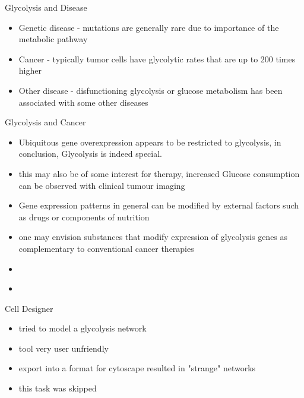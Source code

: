 \begin{frame}{Glycolysis and Disease}
	\begin{itemize}
		\item Genetic disease - mutations are generally rare due to importance of the metabolic pathway
		\item Cancer - typically tumor cells have glycolytic rates that are up to 200 times higher
		\item Other disease - disfunctioning glycolysis or glucose metabolism has been associated with some other diseases
	\end{itemize}
\end{frame}

\begin{frame}{Glycolysis and Cancer}
	\begin{itemize}
		\item Ubiquitous gene overexpression appears to be restricted to glycolysis, in conclusion, Glycolysis is indeed special.
		\item this may also be of some interest for therapy, increased Glucose consumption can be observed with clinical tumour imaging 
		\item Gene expression patterns in general can be modified by external factors such as drugs or components of nutrition
		\item one may envision substances that modify expression of glycolysis genes as complementary to conventional cancer therapies
	\end{itemize}
\end{frame}

\begin{frame}
	\begin{itemize}
		\item
	\end{itemize}
\end{frame}

\begin{frame}
	\begin{itemize}
		\item
	\end{itemize}
\end{frame}


\begin{frame}{Cell Designer}
	\begin{itemize}
		\item tried to model a glycolysis network
		\item tool very user unfriendly
		\item export into a format for cytoscape resulted in "strange" networks
		\item this task was skipped
	\end{itemize}
\end{frame}


